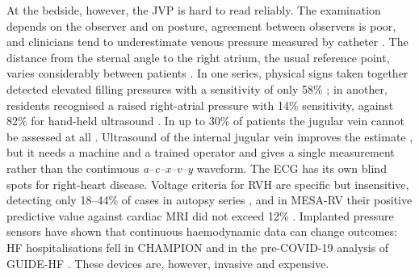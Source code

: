 \documentclass[11pt]{article}
\begin{document}
At the bedside, however, the JVP is hard to read reliably. The examination depends on the observer and on posture, agreement between observers is poor, and clinicians tend to underestimate venous pressure measured by catheter \cite{cook1990clinical,cook1996does,mcgee1998physical}. The distance from the sternal angle to the right atrium, the usual reference point, varies considerably between patients \cite{seth2002far}. In one series, physical signs taken together detected elevated filling pressures with a sensitivity of only 58\% \cite{stevenson1989limited}; in another, residents recognised a raised right-atrial pressure with 14\% sensitivity, against 82\% for hand-held ultrasound \cite{brennan2007comparison}. In up to 30\% of patients the jugular vein cannot be assessed at all \cite{vinayak2006usefulness,sankoff2008noninvasive}. Ultrasound of the internal jugular vein improves the estimate \cite{simon2010detection,pellicori2014revisiting,pellicori2015prognostic,ammirati2024estimation,rudski2010guidelines}, but it needs a machine and a trained operator and gives a single measurement rather than the continuous \textit{a--c--x--v--y} waveform. The ECG has its own blind spots for right-heart disease. Voltage criteria for RVH \cite{sokolow1949ventricular,hancock2009aha} are specific but insensitive, detecting only 18--44\% of cases in autopsy series \cite{murphy1984reevaluation,lehtonen1988electrocardiographic}, and in MESA-RV their positive predictive value against cardiac MRI did not exceed 12\% \cite{whitman2014validity}. Implanted pressure sensors have shown that continuous haemodynamic data can change outcomes: HF hospitalisations fell in CHAMPION \cite{abraham2011wireless} and in the pre-COVID-19 analysis of GUIDE-HF \cite{lindenfeld2021haemodynamic,zile2008transition,stevenson2010chronic}. These devices are, however, invasive and expensive.
\end{document}

